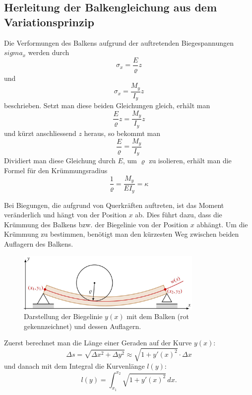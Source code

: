 \subsection{Herleitung der Balkengleichung aus dem Variationsprinzip}
Die Verformungen des Balkens aufgrund der auftretenden Biegespannungen $sigma_x$ werden durch
\begin{equation}
	\sigma_x = \frac{E}{\varrho} z
\end{equation}
und
\begin{equation}
	\sigma_x = \frac{M_y}{I_y} z
\end{equation}
beschrieben. Setzt man diese beiden Gleichungen gleich, erhält man
\begin{equation}
	\frac{E}{\varrho} z = \frac{M_y}{I_y} z
\end{equation}
und kürzt anschliessend $z$ heraus, so bekommt man
\begin{equation}
	\frac{E}{\varrho} = \frac{M_y}{I_y}
\end{equation}
Dividiert man diese Gleichung durch $E$, um $\varrho$ zu isolieren, erhält man die Formel für den Krümmungsradius
\begin{equation}
	\frac{1}{\varrho} = \frac{M_y}{E I_y} = \kappa
\end{equation}

Bei Biegungen, die aufgrund von Querkräften auftreten, ist das Moment veränderlich und hängt von der Position $x$ ab. Dies führt dazu, dass die Krümmung des Balkens bzw. der Biegelinie von der Position $x$ abhängt. Um die Krümmung zu bestimmen, benötigt man den kürzesten Weg zwischen beiden Auflagern des Balkens.
\begin{figure}
	\centering
	\includegraphics[width=0.8\textwidth]{papers/balken/images/teil2/BiegungBalke2.jpg}
	\caption{Darstellung der Biegelinie $y(x)$ mit dem Balken (rot gekennzeichnet) und dessen Auflagern.}
	\label{fig:Darstellung_der_Biegelinie}
\end{figure}

Zuerst berechnet man die Länge einer Geraden auf der Kurve $y(x)$:
\begin{equation}
	\Delta s = \sqrt{\Delta x^2 + \Delta y^2} \approx \sqrt{1 + y'(x)^2} \cdot \Delta x
\end{equation}
und danach mit dem Integral die Kurvenlänge $l(y)$:
\begin{equation}
	l(y) = \int_{x_1}^{x_2} \sqrt{1 + {y'(x)}^2} \, dx.
\end{equation}

